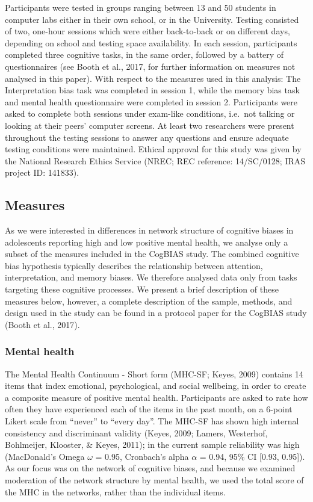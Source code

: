 \documentclass[
  english,
  man,floatsintext]{apa6}
\begin{document}
Participants were tested in groups ranging between 13 and 50 students in computer labs either in their own school, or in the University. Testing consisted of two, one-hour sessions which were either back-to-back or on different days, depending on school and testing space availability. In each session, participants completed three cognitive tasks, in the same order, followed by a battery of questionnaires (see Booth et al., 2017, for further information on measures not analysed in this paper). With respect to the measures used in this analysis: The Interpretation bias task was completed in session 1, while the memory bias task and mental health questionnaire were completed in session 2. Participants were asked to complete both sessions under exam-like conditions, i.e.~not talking or looking at their peers' computer screens. At least two researchers were present throughout the testing sessions to answer any questions and ensure adequate testing conditions were maintained. Ethical approval for this study was given by the National Research Ethics Service (NREC; REC reference: 14/SC/0128; IRAS project ID: 141833).

\hypertarget{measures}{%
\subsection{Measures}\label{measures}}

As we were interested in differences in network structure of cognitive biases in adolescents reporting high and low positive mental health, we analyse only a subset of the measures included in the CogBIAS study. The combined cognitive bias hypothesis typically describes the relationship between attention, interpretation, and memory biases. We therefore analysed data only from tasks targeting these cognitive processes. We present a brief description of these measures below, however, a complete description of the sample, methods, and design used in the study can be found in a protocol paper for the CogBIAS study (Booth et al., 2017).

\hypertarget{mental-health}{%
\subsubsection{Mental health}\label{mental-health}}

The Mental Health Continuum - Short form (MHC-SF; Keyes, 2009) contains 14 items that index emotional, psychological, and social wellbeing, in order to create a composite measure of positive mental health. Participants are asked to rate how often they have experienced each of the items in the past month, on a 6-point Likert scale from \enquote{never} to \enquote{every day}. The MHC-SF has shown high internal consistency and discriminant validity (Keyes, 2009; Lamers, Westerhof, Bohlmeijer, Klooster, \& Keyes, 2011); in the current sample reliability was high (MacDonald's Omega \(\omega\) = 0.95, Cronbach's alpha \(\alpha\) = 0.94, 95\% CI {[}0.93, 0.95{]}). As our focus was on the network of cognitive biases, and because we examined moderation of the network structure by mental health, we used the total score of the MHC in the networks, rather than the individual items.
\end{document}
